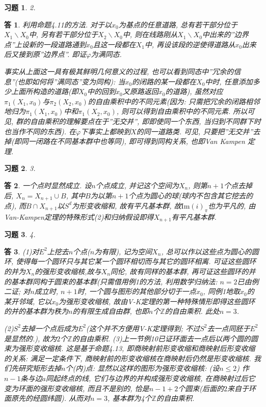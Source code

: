 \documentclass{ctexart}%
\newtheorem*{exercise}{习题}
\newtheorem*{solution}{答}
\theoremstyle{definition}
\theoremstyle{remark}
\begin{document}
\begin{exercise}2.
\end{exercise}
\begin{solution}
利用命题4.11的方法. 对于以$x_0$为基点的任意道路, 总有若干部分位于$X_1\backslash X_0$中, 另有若干部分位于$X_2\backslash X_0$中, 则在线路刚从$X_1\backslash X_0$中出来的''边界点''上设新的一段道路通到$x_0$且这一段都在$X_1$中, 再设该段的逆使得道路从$x_0$出来后又接到原''边界点''. 即证$\varphi$为满同态. 

事实从上面这一具有极其鲜明几何意义的过程, 也可以看到同态中''冗余的信息''(也即如何将''满同态''变为同构):  当$x_0$的闭路的某一段都在$X_0$中时, 任意添加多少上面所构造的道路(即$X_0$中的回到$x_0$又原路返回$x_0$的道路), 虽然对应$\pi_1(X_1,x_0)$与$\pi_2(X_2,x_0)$的自由乘积中的不同元素(因为: 只需把冗余的闭路相邻地归为$\pi_1(X_1,x_0)$中和$\pi_1(X_2,x_0)$, 则可以得到自由乘积中的不同元素. 所以可见, 群的自由乘积的理解要点在于''无交并'', 即即使同一个东西, 当归到不同群下时也当作不同的东西). 在$\varphi$下事实上都映到$X$的同一道路类. 可见, 只要把''无交并''去掉(即同一闭路在不同基本群中也等同), 即可得到同构关系, 也即Van Kampen 定理. 
\end{solution}

\begin{exercise}3.
\end{exercise}
\begin{solution}
一个点时显然成立. 设$n$个点成立, 并记这个空间为$X_n$, 则第$n+1$个点去掉后, $X_n=X_{n+1}\cup B$, 其中$B$为以第$n+1$个点为圆心的球(球内不包含其它挖去的点), 而$B\cap X_{n+1}$以$S^d$为形变收缩和, 故有平凡基本群, 故$\text{Im}(i)_\pi$也为平凡的, 由Van-Kampen定理的特殊形式(2)和归纳假设即得$X_{n+1}$有平凡基本群.
\end{solution}

\begin{exercise}4.
\end{exercise}
\begin{solution}(1)对$E^2$上挖去$n$个点($n$为有限), 记为空间$X_n$, 总可以作以这些点为圆心的圆环, 使得每一个圆环只与其它某一个圆环相切而与其它的圆环相离. 可证这些圆环的并为$X_n$的强形变收缩核,故与$X_n$同伦, 故有同样的基本群, 再可证这些圆环的并的基本群同构于圆束的基本群(只需借用例1的方法, 利用数学归纳法: $n=2$已由例二证; 对$n$成立时, $n+1$时, 一个圆与图形的其他部分切于一点$x_0$, 同例1地取$x_0$的某开邻域, 它以$x_0$为强形变收缩核, 故由V-K定理的第一种特殊情形即得这些圆环的并的基本群为秩为$n$的有限生成自由群, 也即$n$个$\mathbb{Z}$的自由乘积. 此处$n=3$. 

(2)$S^2$去掉一个点后成为$E^2$(这个并不方便用V-K定理得到; 不过$S^2$去一点同胚于$E^2$是显然的.), 故为$2$个$\mathbb{Z}$的自由乘积. (3)上一节例10已证环面去一点后以两个圆的圆束为强形变收缩核. 这是基于命题4.13, 即商映射前形变收缩和商映射后形变收缩的关系: 满足一定条件下, 商映射前的形变收缩核在商映射后仍然是形变收缩核. 我们先研究矩形去掉$n$个(内)点: 显然以这样的图形为强形变收缩核: (设$n\leq 2$) 作$n-1$条与边$a$同起终点的线, 它们与边界的并构成强形变收缩核, 在商映射过后它变为环面的强形变收缩核, 而且不是别的, 恰是$n-1+2$个圆束(后面的$2$来自于环面原先的经圆纬圆). 从而对$n=3$, 基本群为4个$\mathbb{Z}$的自由乘积.
\end{solution}
\end{document}
